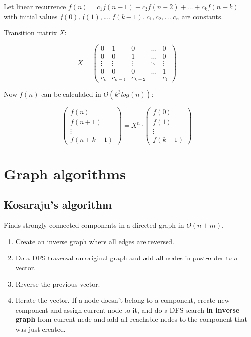 \documentclass{article}
\begin{document}
Let linear recurrence $f(n) = c_1f(n-1) + c_2f(n-2) + \dots + c_kf(n-k)$ with initial values $f(0), f(1), \dots, f(k-1)$. $c_1, c_2, \dots, c_n$ are constants.

Transition matrix $X$:

\[
	X =
	\begin{pmatrix}
		0 & 1 & 0 & \dots & 0 \\
		0 & 0 & 1 & \dots & 0 \\
		\vdots & \vdots & \vdots & \ddots & \vdots \\
		0 & 0 & 0 & \dots & 1 \\
		c_k & c_{k-1} & c_{k-2} & \dots & c_1
	\end{pmatrix}
\]

Now $f(n)$ can be calculated in $O(k^3 log(n))$:

\[
	\begin{pmatrix}
		f(n) \\
		f(n+1) \\
		\vdots \\
		f(n+k-1)
	\end{pmatrix}
	= X^n \cdot
	\begin{pmatrix}
		f(0) \\
		f(1) \\
		\vdots \\
		f(k-1)
	\end{pmatrix}
\]



\section {Graph algorithms}

\subsection {Kosaraju's algorithm}

Finds strongly connected components in a directed graph in $O(n + m)$.

\begin{enumerate}
	\item Create an inverse graph where all edges are reversed.
	\item Do a DFS traversal on original graph and add all nodes in post-order to a vector.
	\item Reverse the previous vector.
	\item Iterate the vector. If a node doesn't belong to a component, create new component and assign current node to it, and do a DFS search \textbf{in inverse graph} from current node and add all reachable nodes to the component that was just created.
\end{enumerate}
\end{document}

